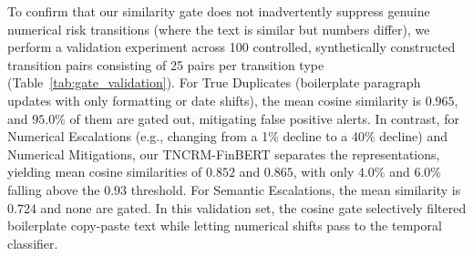 \documentclass[journal]{IEEEtran}
\begin{document}
To confirm that our similarity gate does not inadvertently suppress genuine numerical risk transitions (where the text is similar but numbers differ), we perform a validation experiment across 100 controlled, synthetically constructed transition pairs consisting of 25 pairs per transition type (Table~\ref{tab:gate_validation}). For True Duplicates (boilerplate paragraph updates with only formatting or date shifts), the mean cosine similarity is $0.965$, and $95.0\%$ of them are gated out, mitigating false positive alerts. In contrast, for Numerical Escalations (e.g., changing from a 1\% decline to a 40\% decline) and Numerical Mitigations, our TNCRM-FinBERT separates the representations, yielding mean cosine similarities of $0.852$ and $0.865$, with only $4.0\%$ and $6.0\%$ falling above the $0.93$ threshold. For Semantic Escalations, the mean similarity is $0.724$ and none are gated. In this validation set, the cosine gate selectively filtered boilerplate copy-paste text while letting numerical shifts pass to the temporal classifier.

\begin{table}[h]
\centering
\caption{Sensitivity Analysis of Cosine Gating Threshold}
\label{tab:sensitivity}
\end{table}

\begin{table}[h]
\centering
\caption{Similarity Gate Validation Across Controlled Transition Types}
\label{tab:gate_validation}
\end{table}
\end{document}
